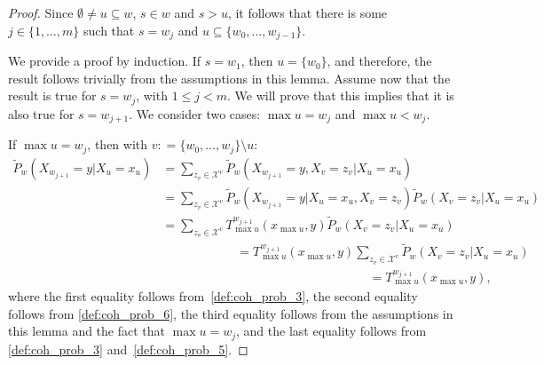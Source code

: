 \documentclass[10pt]{paper}
\theoremstyle{definition}
\newcommand{\states}{\mathcal{X}}
\newcommand{\coloneqq}{:\!=}
\begin{document}
\begin{proof}
Since $\emptyset\neq u\subseteq w$, $s\in w$ and $s>u$, it follows that there is some $j\in\{1,\dots,m\}$ such that $s=w_j$ and $u\subseteq\{w_0,\dots,w_{j-1}\}$.

We provide a proof by induction. If $s=w_1$, then $u=\{w_0\}$, and therefore, the result follows trivially from the assumptions in this lemma. Assume now that the result is true for $s=w_j$, with $1\leq j<m$. We will prove that this implies that it is also true for $s=w_{j+1}$. We consider two cases: $\max u=w_j$ and $\max u<w_j$.

If $\max u=w_j$, then with $v\coloneqq\{w_0,\dots,w_j\}\setminus u$:
\begin{align*}
\tilde{P}_w(X_{w_{j+1}}=y\vert X_u=x_u)
&=\sum_{z_{v}\in\states^{v}}\tilde{P}_w(X_{w_{j+1}}=y, X_{v}=z_{v}\vert X_u=x_u)\\
&=\sum_{z_{v}\in\states^{v}}
\tilde{P}_w(X_{w_{j+1}}=y\vert X_u=x_u, X_{v}=z_{v})
\tilde{P}_w(X_{v}=z_{v}\vert X_u=x_u)\\
&=\sum_{z_{v}\in\states^{v}}
T_{\max u}^{w_{j+1}}(x_{\max u},y)
\tilde{P}_w(X_{v}=z_{v}\vert X_u=x_u)\\[-1mm]
&\quad\quad\quad\quad\quad\quad
=T_{\max u}^{w_{j+1}}(x_{\max u},y)
\sum_{z_{v}\in\states^{v}}
\tilde{P}_w(X_{v}=z_{v}\vert X_u=x_u)\\[-1mm]
&\quad\quad\quad\quad\quad\quad\quad\quad\quad\quad\quad\quad\quad\quad\quad\quad~~~
=T_{\max u}^{w_{j+1}}(x_{\max u},y),
\end{align*}
where the first equality follows from~\ref{def:coh_prob_3}, the second equality follows from \ref{def:coh_prob_6}, the third equality follows from the assumptions in this lemma and the fact that $\max u=w_j$, and the last equality follows from \ref{def:coh_prob_3} and~\ref{def:coh_prob_5}.


\end{proof}
\end{document}

